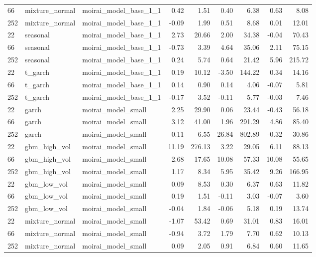 {\begin{tabular}{lllrrrrrr}
66 & mixture\_normal & moirai\_model\_base\_1\_1 & 0.42 & 1.51 & 0.40 & 6.38 & 0.63 & 8.08 \\
252 & mixture\_normal & moirai\_model\_base\_1\_1 & -0.09 & 1.99 & 0.51 & 8.68 & 0.01 & 12.01 \\
\midrule
22 & seasonal & moirai\_model\_base\_1\_1 & 2.73 & 20.66 & 2.00 & 34.38 & -0.04 & 70.43 \\
66 & seasonal & moirai\_model\_base\_1\_1 & -0.73 & 3.39 & 4.64 & 35.06 & 2.11 & 75.15 \\
252 & seasonal & moirai\_model\_base\_1\_1 & 0.24 & 5.74 & 0.64 & 21.42 & 5.96 & 215.72 \\
\midrule
22 & t\_garch & moirai\_model\_base\_1\_1 & 0.19 & 10.12 & -3.50 & 144.22 & 0.34 & 14.16 \\
66 & t\_garch & moirai\_model\_base\_1\_1 & 0.14 & 0.90 & 0.14 & 4.06 & -0.07 & 5.81 \\
252 & t\_garch & moirai\_model\_base\_1\_1 & -0.17 & 3.52 & -0.11 & 5.77 & -0.03 & 7.46 \\
\midrule
22 & garch & moirai\_model\_small & 2.25 & 29.90 & 0.06 & 23.44 & -0.43 & 56.18 \\
66 & garch & moirai\_model\_small & 3.12 & 41.00 & 1.96 & 291.29 & 4.86 & 85.40 \\
252 & garch & moirai\_model\_small & 0.11 & 6.55 & 26.84 & 802.89 & -0.32 & 30.86 \\
\midrule
22 & gbm\_high\_vol & moirai\_model\_small & 11.19 & 276.13 & 3.22 & 29.05 & 6.11 & 88.13 \\
66 & gbm\_high\_vol & moirai\_model\_small & 2.68 & 17.65 & 10.08 & 57.33 & 10.08 & 55.65 \\
252 & gbm\_high\_vol & moirai\_model\_small & 1.17 & 8.34 & 5.95 & 35.42 & 9.26 & 166.95 \\
\midrule
22 & gbm\_low\_vol & moirai\_model\_small & 0.09 & 8.53 & 0.30 & 6.37 & 0.63 & 11.82 \\
66 & gbm\_low\_vol & moirai\_model\_small & 0.19 & 1.51 & -0.11 & 3.03 & -0.07 & 3.60 \\
252 & gbm\_low\_vol & moirai\_model\_small & -0.04 & 1.84 & -0.06 & 5.18 & 0.19 & 13.74 \\
\midrule
22 & mixture\_normal & moirai\_model\_small & -1.07 & 53.42 & 0.69 & 31.01 & 0.83 & 16.01 \\
66 & mixture\_normal & moirai\_model\_small & -0.94 & 3.72 & 1.79 & 7.70 & 0.62 & 10.13 \\
252 & mixture\_normal & moirai\_model\_small & 0.09 & 2.05 & 0.91 & 6.84 & 0.60 & 11.65 \\

\end{tabular}}
